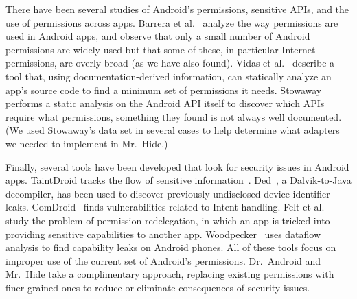 \documentclass[preprint]{sig-alternate-10pt}
\newcommand{\lib}{Mr.\ Hide\xspace}
\newcommand{\rewriter}{Dr.\ Android\xspace}
\begin{document}
There have been several studies of Android's permissions, sensitive
APIs, and the use of permissions across apps.  Barrera et
al.~\cite{barrera2010methodology} analyze the way permissions are used
in Android apps, and observe that only a small number of Android
permissions are widely used but that some of these, in particular
Internet permissions, are overly broad (as we have also found). Vidas
et al.~\cite{vidas:w2sp11} describe a tool that, using
documentation-derived information, can statically analyze an app's
source code to find a minimum set of permissions it
needs. Stowaway~\cite{felt:ccs11} performs a static analysis on the
Android API itself to discover which APIs require what permissions,
something they found is not always well documented. (We used
Stowaway's data set in several cases to help determine what adapters
we needed to implement in \lib.)

Finally, several tools have been developed that look for security
issues in Android apps. TaintDroid tracks the flow of sensitive
information~\cite{taintdroid}. Ded~\cite{ded}, a Dalvik-to-Java
decompiler, has been used to discover previously undisclosed device
identifier leaks. ComDroid~\cite{chin11:mobisys} finds vulnerabilities
related to Intent handling. Felt et al.~\cite{felt2011permission}
study the problem of permission redelegation, in which an app is
tricked into providing sensitive capabilities to another app.
Woodpecker~\cite{grace:ndss12} uses dataflow analysis to find
capability leaks on Android phones. All of these tools focus on
improper use of the current set of Android's permissions. \rewriter
and \lib take a complimentary approach, replacing existing permissions
with finer-grained ones to reduce or eliminate consequences of
security issues.


\end{document}
